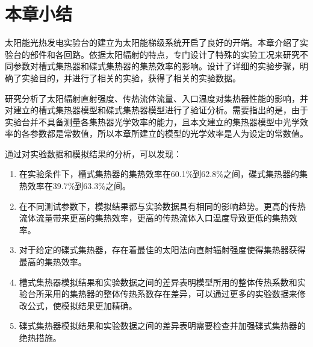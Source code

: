 \section{本章小结}
太阳能光热发电实验台的建立为太阳能梯级系统开启了良好的开端。本章介绍了实验台的部件和各回路。依据太阳辐射的特点，专门设计了特殊的实验工况来研究不同参数对槽式集热器和碟式集热器的集热效率的影响。设计了详细的实验步骤，明确了实验目的，并进行了相关的实验，获得了相关的实验数据。

研究分析了太阳辐射直射强度、传热流体流量、入口温度对集热器性能的影响，并对建立的槽式集热器模型和碟式集热器模型进行了验证分析。需要指出的是，由于实验台并不具备测量各集热器光学效率的能力，且本文建立的集热器模型中光学效率的各参数都是常数值，所以本章所建立的模型的光学效率是人为设定的常数值。

通过对实验数据和模拟结果的分析，可以发现：

\begin{enumerate}[label=(\arabic*)]
\item 在实验条件下，槽式集热器的集热效率在60.1\%到62.8\%之间，碟式集热器的集热效率在39.7\%到63.3\%之间。
\item 在不同测试参数下，模拟结果都与实验数据具有相同的影响趋势。更高的传热流体流量带来更高的集热效率，更高的传热流体入口温度导致更低的集热效率。
\item 对于给定的碟式集热器，存在着最佳的太阳法向直射辐射强度使得集热器获得最高的集热效率。
\item 槽式集热器模拟结果和实验数据之间的差异表明模型所用的整体传热系数和实验台所采用的集热器的整体传热系数存在差异，可以通过更多的实验数据来修改公式，使模拟结果更加精确。
\item 碟式集热器模拟结果和实验数据之间的差异表明需要检查并加强碟式集热器的绝热措施。
\end{enumerate}